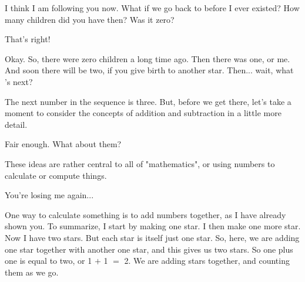 \documentclass[main.tex]{subfiles}
\begin{document}
\par \Maia I think I am following you now.  What if we go back to before I ever existed?  How many children did you have then?  Was it zero?

\par \Pleione That's right!

\par \Maia Okay.  So, there were zero children a long time ago.  Then there was one, or me.  And soon there will be two, if you give birth to another star.  Then... wait, what 's next?

\par \Pleione The next number in the sequence is three.  But, before we get there, let's take a moment to consider the concepts of addition and subtraction in a little more detail.

\par \Maia Fair enough.  What about them?

\par \Pleione These ideas are rather central to all of "mathematics", or using numbers to calculate or compute things.



\par \Maia You're losing me again...

\par \Pleione One way to calculate something is to add numbers together, as I have already shown you.  To summarize, I start by making one star.  I then make one more star.  Now I have two stars.  But each star is itself just one star.  So, here, we are adding one star together with another one star, and this gives us two stars.  So one plus one is equal to two, or 1 $+$ 1 $=$ 2.  We are adding stars together, and counting them as we go.
\end{document}
